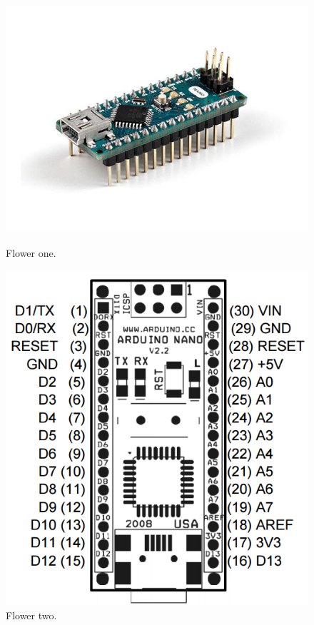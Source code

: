 \begin{figure}[h]
	\centering
	\begin{minipage}[b]{0.4\textwidth}
		\includegraphics[width=\textwidth]{img/hardware/nano-img.jpg}
		\caption{Flower one.}
	\end{minipage}
	\hfill
	\begin{minipage}[b]{0.3\textwidth}
		\includegraphics[width=\textwidth]{img/hardware/nano-esquema.png}
		\caption{Flower two.}
	\end{minipage}
\end{figure}




